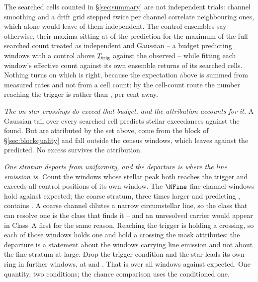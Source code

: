 The searched cells counted in \S\ref{sec:summary} are not independent
trials: channel smoothing and a drift grid stepped twice per channel
correlate neighbouring ones, which alone would leave \StGridFrac{} of them
independent. The control ensembles say otherwise, their maxima sitting at
\CtrlMaxRatioMed{} of the prediction for the maximum of the full searched
count treated as independent and Gaussian -- a budget predicting
\NCtrlWinExp{} windows with a control above $T_{\rm trig}$ against the
\NCtrlWinObs{} observed -- while fitting each window's effective count
against its own ensemble returns \StNindFrac{} of its searched cells. Nothing
turns on which is right, because the expectation above is summed from measured
rates and not from a cell count: by the cell-count route the number reaching
the trigger is \StExpModel{} rather than \CeExpTrig, \StModelAgreePct{} per
cent away.

\emph{The on-star crossings do exceed that budget, and the attribution
accounts for it.} A Gaussian tail over every searched cell predicts
\CellExpect{} stellar exceedances against the \NCross{} found. But \MkAttr{}
are attributed by the set above, \EvNCrossFlag{} come from the block of
\S\ref{sec:blockquality} and \CeNTailCross{} fall outside the census windows,
which leaves \CeObs{} against the \CeExpSurv{} predicted. No excess survives
the
attribution.

\emph{One stratum departs from uniformity, and the departure is where the
line emission is.} Count the windows whose stellar peak both reaches the
trigger and exceeds all \NCtrl{} control positions of its own window. The
$\NFine$ fine-channel windows hold \NStageOneFine{} against
\ExpStageOneFine{} expected; the coarse stratum, three times larger and
predicting \ExpStageOneCoarse, contains \NStageOneCoarse. A coarse
channel dilutes a narrow circumstellar line, so the class that can resolve
one is the class that finds it -- and an unresolved carrier would appear in
Class~A first for the same reason. Reaching the trigger is holding a
crossing, so each of those windows holds one and \CeFirstAttr{} hold a
crossing the mask attributes: the departure is a statement about the windows
carrying line emission and not about the fine stratum at large. Drop the
trigger condition and the star leads its own ring in \BkFirstBelow{} further
windows, at \BkFirstBelowTLo{} and \BkFirstBelowTHi. That is \NsrFirstObs{}
over all \NWindows{} windows against \NsrFirstExp{} expected. One quantity,
two conditions; the chance comparison uses the conditioned one.

